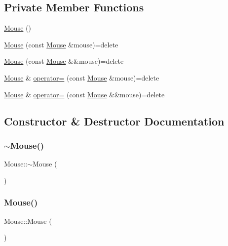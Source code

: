 \subsection*{Private Member Functions}
\begin{DoxyCompactItemize}
\item 
\mbox{\hyperlink{classsc_1_1_mouse_a99024d3700d649ae19c1537b42a3e86d}{Mouse}} ()
\item 
\mbox{\hyperlink{classsc_1_1_mouse_a00f31e6c9784326aaa85a7b406c3a5e1}{Mouse}} (const \mbox{\hyperlink{classsc_1_1_mouse}{Mouse}} \&mouse)=delete
\item 
\mbox{\hyperlink{classsc_1_1_mouse_a54a8b28933bcd108f09a92c51a50098a}{Mouse}} (const \mbox{\hyperlink{classsc_1_1_mouse}{Mouse}} \&\&mouse)=delete
\item 
\mbox{\hyperlink{classsc_1_1_mouse}{Mouse}} \& \mbox{\hyperlink{classsc_1_1_mouse_a7595b361d02ffe2bdb658784f0b29a68}{operator=}} (const \mbox{\hyperlink{classsc_1_1_mouse}{Mouse}} \&mouse)=delete
\item 
\mbox{\hyperlink{classsc_1_1_mouse}{Mouse}} \& \mbox{\hyperlink{classsc_1_1_mouse_aa84efee53d6b684486d2edc79f8ea898}{operator=}} (const \mbox{\hyperlink{classsc_1_1_mouse}{Mouse}} \&\&mouse)=delete
\end{DoxyCompactItemize}


\subsection{Constructor \& Destructor Documentation}
\mbox{\label{classsc_1_1_mouse_afdf7d8abef29c10be77ead773f964f4f}} 
\subsubsection{\texorpdfstring{$\sim$Mouse()}{~Mouse()}}
{\footnotesize\ttfamily Mouse\+::$\sim$\+Mouse (\begin{DoxyParamCaption}{ }\end{DoxyParamCaption})}

\mbox{\label{classsc_1_1_mouse_a99024d3700d649ae19c1537b42a3e86d}} 
\subsubsection{\texorpdfstring{Mouse()}{Mouse()}\hspace{0.1cm}{\footnotesize\ttfamily [1/3]}}
{\footnotesize\ttfamily Mouse\+::\+Mouse (\begin{DoxyParamCaption}{ }\end{DoxyParamCaption})\hspace{0.3cm}{\ttfamily [private]}}

